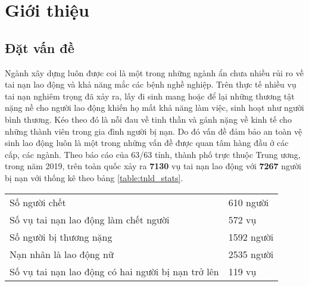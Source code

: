 \chapter{Giới thiệu}
\setcounter{page}{1}
\section{Đặt vấn đề}
Ngành xây dựng luôn được coi là một trong những ngành ẩn chưa nhiều rủi ro về tai nạn lao động 
và khả năng mắc các bệnh nghề nghiệp. Trên thực tế nhiều vụ tai nạn nghiêm trọng đã xảy ra, lấy đi 
sinh mang hoặc để lại những thương tật nặng nề cho người lao động khiến họ mất khả năng làm việc, 
sinh hoạt như người bình thương. Kéo theo đó là nỗi đau về tinh thần và gánh nặng về kinh tế 
cho những thành viên trong gia đình người bị nạn. Do đó vấn đề đảm bảo an toàn vệ sinh lao động luôn là một trong những vấn đề được quan tâm hàng đầu ở các cấp, các ngành. Theo báo cáo của 63/63 tỉnh, thành phố trực thuộc Trung ương\cite{tnld:2019:gov}, trong năm 2019, trên toàn quốc xảy ra \textbf{7130} vụ tai nạn lao động với \textbf{7267} người bị nạn với thống kê theo bảng \ref{table:tnld_stats}.
\begin{center}

  \begin{tabular} {l l}
  \toprule
  \midrule

  Số người chết & 610 người\\
  Số vụ tai nạn lao động làm chết người & 572 vụ\\
  Số người bị thương nặng & 1592 người \\
  Nạn nhân là lao động nữ & 2535 người \\
  Số vụ tai nạn lao động có hai người bị nạn trở lên & 119 vụ \\
          
  \bottomrule
  \end{tabular}

\end{center}

